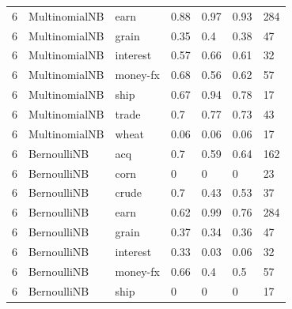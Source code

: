 \documentclass{article}
\begin{document}
\begin{table}[h]
\begin{tabular}{lllllll}
6             & MultinomialNB          & earn            & 0.88               & 0.97            & 0.93              & 284              \\
6             & MultinomialNB          & grain           & 0.35               & 0.4             & 0.38              & 47               \\
6             & MultinomialNB          & interest        & 0.57               & 0.66            & 0.61              & 32               \\
6             & MultinomialNB          & money-fx        & 0.68               & 0.56            & 0.62              & 57               \\
6             & MultinomialNB          & ship            & 0.67               & 0.94            & 0.78              & 17               \\
6             & MultinomialNB          & trade           & 0.7                & 0.77            & 0.73              & 43               \\
6             & MultinomialNB          & wheat           & 0.06               & 0.06            & 0.06              & 17               \\
6             & BernoulliNB            & acq             & 0.7                & 0.59            & 0.64              & 162              \\
6             & BernoulliNB            & corn            & 0                  & 0               & 0                 & 23               \\
6             & BernoulliNB            & crude           & 0.7                & 0.43            & 0.53              & 37               \\
6             & BernoulliNB            & earn            & 0.62               & 0.99            & 0.76              & 284              \\
6             & BernoulliNB            & grain           & 0.37               & 0.34            & 0.36              & 47               \\
6             & BernoulliNB            & interest        & 0.33               & 0.03            & 0.06              & 32               \\
6             & BernoulliNB            & money-fx        & 0.66               & 0.4             & 0.5               & 57               \\
6             & BernoulliNB            & ship            & 0                  & 0               & 0                 & 17               \\

\end{tabular}
\end{table}
\end{document}
